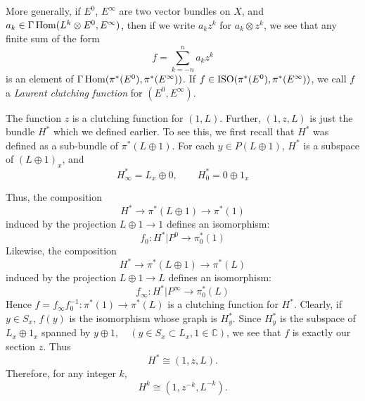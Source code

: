 More generally, if $E^0$, $E^\infty$ are two vector bundles on $X$, and $a_k \in \Gamma\operatorname{Hom}(L^k \otimes E^0, E^\infty)$, then if we write $a_k z^k$ for $a_k \otimes z^k$, we see that any finite sum of the form
\begin{equation*}
    f = \sum_{k = -n}^n a_k z^k
\end{equation*}
is an element of $\Gamma\operatorname{Hom}(\pi^*(E^0), \pi^*(E^\infty))$. If $f \in \operatorname{ISO}(\pi^*(E^0), \pi^*(E^\infty))$, we call $f$ a \textit{Laurent clutching function} for $(E^0, E^\infty)$. \par 

The function $z$ is a clutching function for $(1, L)$. Further, $(1, z, L)$ is just the bundle $H^*$ which we defined earlier. To see this, we first recall that $H^*$ was defined as a sub-bundle of $\pi^*(L \oplus 1)$. For each $y \in P(L \oplus 1)$, $H^*$ is a subspace of $(L \oplus 1)_x$, and
\begin{equation*}
    H^*_\infty = L_x \oplus 0, \qquad H^*_0 = 0 \oplus 1_x
\end{equation*}

Thus, the composition
\begin{equation*}
    H^* \to \pi^*(L \oplus 1) \to \pi^*(1)
\end{equation*}
induced by the projection $L \oplus 1 \to 1$ defines an isomorphism:
\begin{equation*}
    f_0: H^* \vert P^0 \to \pi^*_0(1)
\end{equation*}
Likewise, the composition
\begin{equation*}
    H^* \to \pi^*(L \oplus 1) \to \pi^*(L)
\end{equation*}
induced by the projection $L \oplus 1 \to L$ defines an isomorphism:
\begin{equation*}
    f_\infty: H^* \vert P^\infty \to \pi^*_0(L)
\end{equation*}
Hence $f = f_\infty f_0^{-1}: \pi^*(1) \to \pi^*(L)$ is a clutching function for $H^*$. Clearly, if $y \in S_x$, $f(y)$ is the isomorphism whose graph is $H^*_y$. Since $H^*_y$ is the subspace of $L_x \oplus 1_x$ spanned by $y \oplus 1, \quad (y \in S_x \subset L_x, 1 \in \mathbb{C})$, we see that $f$ is exactly our section $z$. Thus
\begin{equation*}
    H^* \cong (1, z, L).
\end{equation*}
Therefore, for any integer $k$,
\begin{equation*}
    H^k \cong (1, z^{-k}, L^{-k}).
\end{equation*} \par 

